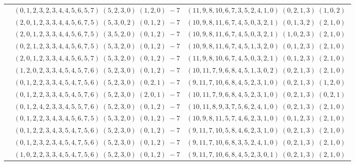 \documentclass[11pt]{article}
\begin{document}
\begin{longtable}[l]{|c|c|c|}
 \cline{2-3} 
 & $(0 ,1 ,2 ,3 ,2 ,3 ,4 ,4 ,5 ,6 ,5 ,7) \;(5 ,2 ,3 ,0) \;(1 ,2 ,0) \;-7$ & $(11 ,9 ,8 ,10 ,6 ,7 ,3 ,5 ,2 ,4 ,1 ,0) \;(0 ,2 ,1 ,3) \;(1 ,0 ,2) \;$\\ 
 \cline{2-3} 
 & $(2 ,0 ,1 ,2 ,3 ,3 ,4 ,4 ,5 ,6 ,7 ,5) \;(5 ,3 ,0 ,2) \;(0 ,1 ,2) \;-7$ & $(10 ,9 ,8 ,11 ,6 ,7 ,4 ,5 ,0 ,3 ,2 ,1) \;(0 ,1 ,3 ,2) \;(2 ,1 ,0) \;$\\ 
 \cline{2-3} 
 & $(2 ,0 ,1 ,2 ,3 ,3 ,4 ,4 ,5 ,6 ,7 ,5) \;(3 ,5 ,2 ,0) \;(0 ,1 ,2) \;-7$ & $(10 ,9 ,8 ,11 ,6 ,7 ,4 ,5 ,0 ,3 ,2 ,1) \;(1 ,0 ,2 ,3) \;(2 ,1 ,0) \;$\\ 
 \cline{2-3} 
 & $(0 ,2 ,1 ,2 ,3 ,3 ,4 ,4 ,5 ,6 ,7 ,5) \;(5 ,3 ,2 ,0) \;(0 ,1 ,2) \;-7$ & $(10 ,9 ,8 ,11 ,6 ,7 ,4 ,5 ,1 ,3 ,2 ,0) \;(0 ,1 ,2 ,3) \;(2 ,1 ,0) \;$\\ 
 \cline{2-3} 
 & $(2 ,0 ,1 ,2 ,3 ,3 ,4 ,4 ,5 ,6 ,5 ,7) \;(5 ,3 ,2 ,0) \;(0 ,1 ,2) \;-7$ & $(11 ,9 ,8 ,10 ,6 ,7 ,4 ,5 ,0 ,3 ,2 ,1) \;(0 ,1 ,2 ,3) \;(2 ,1 ,0) \;$\\ 
 \cline{2-3} 
 & $(1 ,2 ,0 ,2 ,3 ,3 ,4 ,5 ,4 ,5 ,7 ,6) \;(5 ,2 ,3 ,0) \;(0 ,1 ,2) \;-7$ & $(10 ,11 ,7 ,9 ,6 ,8 ,4 ,5 ,1 ,3 ,0 ,2) \;(0 ,2 ,1 ,3) \;(2 ,1 ,0) \;$\\ 
 \cline{2-3} 
 & $(0 ,1 ,2 ,2 ,3 ,3 ,4 ,5 ,4 ,7 ,5 ,6) \;(5 ,2 ,3 ,0) \;(0 ,2 ,1) \;-7$ & $(9 ,11 ,7 ,10 ,6 ,8 ,4 ,5 ,2 ,3 ,1 ,0) \;(0 ,2 ,1 ,3) \;(1 ,2 ,0) \;$\\ 
 \cline{2-3} 
 & $(0 ,1 ,2 ,2 ,3 ,3 ,4 ,5 ,4 ,5 ,7 ,6) \;(5 ,2 ,3 ,0) \;(2 ,0 ,1) \;-7$ & $(10 ,11 ,7 ,9 ,6 ,8 ,4 ,5 ,2 ,3 ,1 ,0) \;(0 ,2 ,1 ,3) \;(0 ,2 ,1) \;$\\ 
 \cline{2-3} 
 & $(0 ,1 ,2 ,4 ,2 ,3 ,3 ,4 ,5 ,5 ,7 ,6) \;(5 ,2 ,3 ,0) \;(0 ,1 ,2) \;-7$ & $(10 ,11 ,8 ,9 ,3 ,7 ,5 ,6 ,2 ,4 ,1 ,0) \;(0 ,2 ,1 ,3) \;(2 ,1 ,0) \;$\\ 
 \cline{2-3} 
 & $(0 ,1 ,2 ,2 ,3 ,4 ,3 ,4 ,5 ,6 ,7 ,5) \;(5 ,3 ,2 ,0) \;(0 ,1 ,2) \;-7$ & $(10 ,9 ,8 ,11 ,5 ,7 ,4 ,6 ,2 ,3 ,1 ,0) \;(0 ,1 ,2 ,3) \;(2 ,1 ,0) \;$\\ 
 \cline{2-3} 
 & $(0 ,1 ,2 ,2 ,3 ,4 ,3 ,5 ,4 ,7 ,5 ,6) \;(5 ,2 ,3 ,0) \;(0 ,1 ,2) \;-7$ & $(9 ,11 ,7 ,10 ,5 ,8 ,4 ,6 ,2 ,3 ,1 ,0) \;(0 ,2 ,1 ,3) \;(2 ,1 ,0) \;$\\ 
 \cline{2-3} 
 & $(0 ,1 ,2 ,3 ,2 ,3 ,4 ,5 ,4 ,7 ,5 ,6) \;(5 ,2 ,3 ,0) \;(0 ,1 ,2) \;-7$ & $(9 ,11 ,7 ,10 ,6 ,8 ,3 ,5 ,2 ,4 ,1 ,0) \;(0 ,2 ,1 ,3) \;(2 ,1 ,0) \;$\\ 
 \cline{2-3} 
 & $(1 ,0 ,2 ,2 ,3 ,3 ,4 ,5 ,4 ,7 ,5 ,6) \;(5 ,2 ,3 ,0) \;(0 ,1 ,2) \;-7$ & $(9 ,11 ,7 ,10 ,6 ,8 ,4 ,5 ,2 ,3 ,0 ,1) \;(0 ,2 ,1 ,3) \;(2 ,1 ,0) \;$\\ 

\end{longtable}
\end{document}
